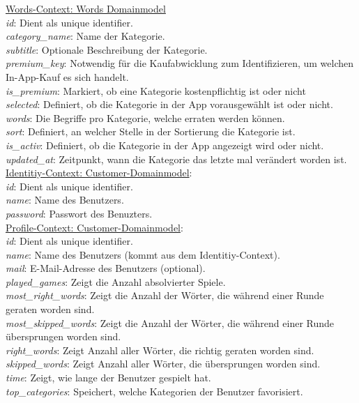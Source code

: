 {\underline{Words-Context: Words Domainmodel}\\
\textit{id}: Dient als unique identifier.\\
\textit{category\_name}: Name der Kategorie.\\
\textit{subtitle}: Optionale Beschreibung der Kategorie.\\
\textit{premium\_key}: Notwendig für die Kaufabwicklung zum Identifizieren, um welchen In-App-Kauf es sich handelt.\\
\textit{is\_premium}: Markiert, ob eine Kategorie kostenpflichtig ist oder nicht\\
\textit{selected}: Definiert, ob die Kategorie in der App vorausgewählt ist oder nicht.\\
\textit{words}: Die Begriffe pro Kategorie, welche erraten werden können.\\
\textit{sort}: Definiert, an welcher Stelle in der Sortierung die Kategorie ist.\\
\textit{is\_activ}: Definiert, ob die Kategorie in der App angezeigt wird oder nicht.\\
\textit{updated\_at}: Zeitpunkt, wann die Kategorie das letzte mal verändert worden ist.\\

\underline{Identitiy-Context: Customer-Domainmodel}:\\
\textit{id}: Dient als unique identifier.\\
\textit{name}: Name des Benutzers.\\
\textit{password}: Passwort des Benuzters.\\

\underline{Profile-Context: Customer-Domainmodel}:\\
\textit{id}: Dient als unique identifier.\\
\textit{name}: Name des Benutzers (kommt aus dem Identitiy-Context).\\
\textit{mail}: E-Mail-Adresse des Benutzers (optional).\\
\textit{played\_games}: Zeigt die Anzahl absolvierter Spiele.\\
\textit{most\_right\_words}: Zeigt die Anzahl der Wörter, die während einer Runde geraten worden sind.\\
\textit{most\_skipped\_words}: Zeigt die Anzahl der Wörter, die während einer Runde übersprungen worden sind.\\
\textit{right\_words}: Zeigt Anzahl aller Wörter, die richtig geraten worden sind.\\
\textit{skipped\_words}: Zeigt Anzahl aller Wörter, die übersprungen worden sind.\\
\textit{time}: Zeigt, wie lange der Benutzer gespielt hat.\\
\textit{top\_categories}: Speichert, welche Kategorien der Benutzer favorisiert.\\

}
